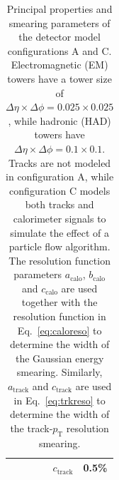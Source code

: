 \documentclass[11pt,letterpaper]{article}
\newcommand{\pt}{\ensuremath{p_{\text{T}}}}
\newcommand{\acalo}{\ensuremath{a_{\text{calo}}}}
\newcommand{\bcalo}{\ensuremath{b_{\text{calo}}}}
\newcommand{\ccalo}{\ensuremath{c_{\text{calo}}}}
\newcommand{\atrk}{\ensuremath{a_{\text{track}}}}
\newcommand{\ctrk}{\ensuremath{c_{\text{track}}}}
\begin{document}
\begin{table}
\begin{tabular}{|l|c|c|c|r@{\ =\ }l|}
           &                &         &           & \ctrk & 0.5\%                                     \\
\hline
\end{tabular}
\caption{Principal properties and smearing parameters of the detector model configurations A and C. Electromagnetic (EM) towers have a tower size of $\Delta\eta\times\Delta\phi = 0.025\times0.025$, while hadronic (HAD) towers have $\Delta\eta\times\Delta\phi = 0.1\times0.1$. Tracks are not modeled in configuration A, while configuration C models both tracks and calorimeter signals to simulate the effect of a particle flow algorithm. The resolution function parameters \acalo, \bcalo{} and \ccalo{} are used together with the resolution function in Eq.~\ref{eq:caloreso} to determine the width of the Gaussian energy smearing.
Similarly, \atrk{} and \ctrk{} are used in Eq.~\ref{eq:trkreso} to determine the width of the track-\pt{} resolution smearing.}
\label{tab:detmodel}
\end{table}
\end{document}
